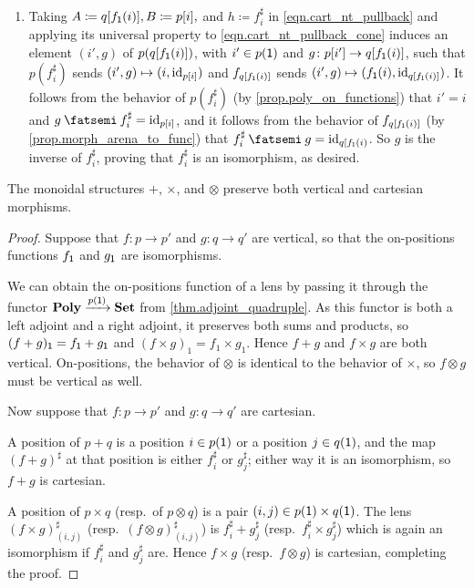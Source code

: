 \documentclass[Book-Poly]{subfiles}
\begin{document}
\begin{exercise}
\begin{solution}
\begin{enumerate}[resume]
    \item Taking $A\coloneqq q[f_{\textsf{1}}(i)], B\coloneqq p[i],$ and $h\coloneqq f^\sharp_i$ in \eqref{eqn.cart_nt_pullback} and applying its universal property to \eqref{eqn.cart_nt_pullback_cone} induces an element $(i',g)$ of $p(q[f_{\textsf{1}}(i)])$, with $i'\in p(\textsf{1})$ and $g\colon p[i']\to q[f_{\textsf{1}}(i)]$, such that $p(f^\sharp_i)$ sends $(i',g)\mapsto(i,\mathrm{id}_{p[i]})$ and $f_{q[f_{\textsf{1}}(i)]}$ sends $(i',g)\mapsto(f_{\textsf{1}}(i),\mathrm{id}_{q[f_{\textsf{1}}(i)]})$.
    It follows from the behavior of $p(f^\sharp_i)$ (by \cref{prop.poly_on_functions}) that $i'=i$ and $g\then f^\sharp_i=\id_{p[i]}$, and it follows from the behavior of $f_{q[f_{\textsf{1}}(i)]}$ (by \cref{prop.morph_arena_to_func}) that $f^\sharp_i\then g=\id_{q[f_\1(i)}$.
    So $g$ is the inverse of $f^\sharp_i$, proving that $f^\sharp_i$ is an isomorphism, as desired.
\end{enumerate}
\end{solution}
\end{exercise}

\begin{proposition}\label{prop.monoidal_pres_vert_cart}
The monoidal structures $+$, $\times$, and $\otimes$ preserve both vertical and cartesian morphisms.
\end{proposition}
\begin{proof}
Suppose that $f\colon p\to p'$ and $g\colon q\to q'$ are vertical, so that the on-positions functions $f_{\textsf{1}}$ and $g_{\textsf{1}}$ are isomorphisms.

We can obtain the on-positions function of a lens by passing it through the functor $\mathbf{Poly}\xrightarrow{p(\textsf{1})}\mathbf{Set}$ from \cref{thm.adjoint_quadruple}.
As this functor is both a left adjoint and a right adjoint, it preserves both sums and products, so $(f+g)_{\textsf{1}} = f_{\textsf{1}}+g_{\textsf{1}}$ and $(f\times g)_1 = f_1\times g_1$.
Hence $f+g$ and $f\times g$ are both vertical.
On-positions, the behavior of $\otimes$ is identical to the behavior of $\times$, so $f\otimes g$ must be vertical as well.

Now suppose that $f\colon p\to p'$ and $g\colon q\to q'$ are cartesian. 

A position of $p+q$ is a position $i\in p(\textsf{1})$ or a position $j\in q(\textsf{1})$, and the map $(f+g)^\sharp$ at that position is either $f^\sharp_i$ or $g^\sharp_j$; either way it is an isomorphism, so $f+g$ is cartesian.

A position of $p\times q$ (resp.\ of $p\otimes q$) is a pair $(i,j)\in p(\textsf{1})\times q(\textsf{1})$. The lens $(f\times g)^\sharp_{(i,j)}$ (resp.\ $(f\otimes g)^\sharp_{(i,j)}$) is $f^\sharp_i+g^\sharp_j$ (resp.\ $f^\sharp_i\times g^\sharp_j$) which is again an isomorphism if $f^\sharp_i$ and $g^\sharp_j$ are. Hence $f\times g$ (resp.\ $f\otimes g$) is cartesian, completing the proof.
\end{proof}
\end{document}
